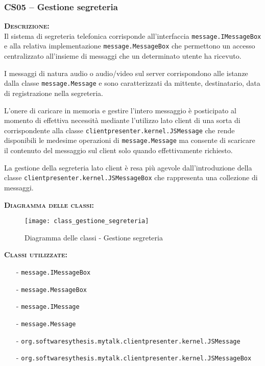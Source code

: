 \subsubsection{CS05 -- Gestione segreteria}
\begin{description}
	\item{\scshape\bfseries Descrizione:}\\
Il sistema di segreteria telefonica corrisponde all'interfaccia \texttt{message.IMessageBox} e alla relativa implementazione \texttt{message.MessageBox} che permettono un accesso centralizzato all'insieme di messaggi che un determinato utente ha ricevuto.

I messaggi di natura audio o audio/video sul server corrispondono alle istanze dalla classe \texttt{message.Message} e sono caratterizzati da mittente, destinatario, data di registrazione nella segreteria.

L'onere di caricare in memoria e gestire l'intero messaggio è posticipato al momento di effettiva necessità mediante l'utilizzo lato client di una sorta di  corrispondente alla classe \texttt{clientpresenter.kernel.JSMessage} che rende disponibili le medesime operazioni di \texttt{message.Message} ma consente di scaricare il contenuto del messaggio sul client solo quando effettivamente richiesto.

La gestione della segreteria lato client è resa più agevole dall'introduzione della classe \texttt{clientpresenter.kernel.JSMessageBox} che rappresenta una collezione di messaggi.

	\item{\scshape\bfseries Diagramma delle classi:}
\begin{figure}[H]
  \centering
  \texttt{[image: class\_gestione\_segreteria]}
  \caption{Diagramma delle classi - Gestione segreteria}\label{fig:gestione_segreteria}
\end{figure}	
	
	\item{\scshape\bfseries Classi utilizzate:}
	\begin{itemize}[noitemsep,nolistsep]
	  \item[-] \texttt{message.IMessageBox}
	  \item[-] \texttt{message.MessageBox}
		\item[-] \texttt{message.IMessage}
	  \item[-] \texttt{message.Message}
	  \item[-] \texttt{org.softwaresythesis.mytalk.clientpresenter.kernel.JSMessage}
	  \item[-] \texttt{org.softwaresythesis.mytalk.clientpresenter.kernel.JSMessageBox}
	\end{itemize}
\end{description}

